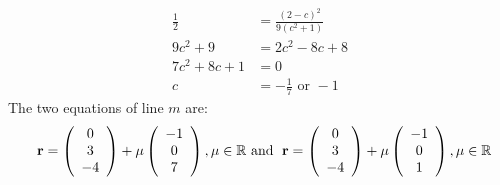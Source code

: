 \documentclass[12pt, a4 paper]{article}
\begin{document}
\begin{outline}[enumerate]
\begin{align*}
					\end{align*}
					\begin{align*}
						\frac{1}{2} & = \frac{{{{(2 - c)}^2}}}{{9({c^2} + 1)}} \\9{c^2} + 9 &= 2{c^2} - 8c + 8\\7{c^2} + 8c + 1 &= 0\\c &=  - \frac{1}{7}{\textrm{ or }} - 1
					\end{align*}
					\textrm{The two equations of line }$m${ are: }
					\begin{align*}
						{\textrm{ }}\;{\bf{r}} = \left( {\begin{array}{*{20}{c}}0 \\3\\{ - 4}\end{array}} \right) + \mu \left( {\begin{array}{*{20}{c}}{ - 1}\\0\\7\end{array}} \right),\mu  \in \mathbb{R}{\textrm{ and  }}\;{\bf{r}} = \left( {\begin{array}{*{20}{c}}0\\3\\{ - 4}\end{array}} \right) + \mu \left( {\begin{array}{*{20}{c}}{ - 1}\\0\\1\end{array}} \right),\mu  \in \mathbb{R}
					\end{align*}
																						            
					\color{black}
										

\end{outline}
\end{document}
